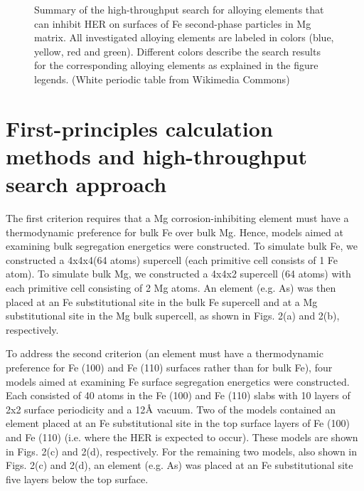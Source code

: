\begingroup
\begin{figure}[!ht]
  \centering
  \caption[Summary of the high-throughput search for alloying elements that can inhibit HER on surfaces of Fe second-phase particles in Mg matrix]{Summary of the high-throughput search for alloying elements that can inhibit \ac{HER} on surfaces of Fe second-phase particles in Mg matrix. All investigated alloying elements are labeled in colors (blue, yellow, red and green). Different colors describe the search results for the corresponding alloying elements as explained in the figure legends. (White periodic table from Wikimedia Commons)}
  \label{Chap:Mg_H:fig4}
\end{figure}
\endgroup

\section{First-principles calculation methods and high-throughput search approach}
\label{chap:Mg_H:sec:calculation}

The first criterion requires that a Mg corrosion-inhibiting element must have a thermodynamic preference for bulk Fe over bulk Mg. Hence, models aimed at examining bulk segregation energetics were constructed. To simulate bulk Fe, we constructed a 4x4x4(64 atoms) supercell (each primitive cell consists of 1 Fe atom). To simulate bulk Mg, we constructed a 4x4x2 supercell (64 atoms) with each primitive cell consisting of 2 Mg atoms. An element (e.g. As) was then placed at an Fe substitutional site in the bulk Fe supercell and at a Mg substitutional site in the Mg bulk supercell, as shown in Figs. 2(a) and 2(b), respectively.

To address the second criterion (an element must have a thermodynamic preference for Fe (100) and Fe (110) surfaces rather than for bulk Fe), four models aimed at examining Fe surface segregation energetics were constructed. Each consisted of 40 atoms in the Fe (100) and Fe (110) slabs with 10 layers of 2x2 surface periodicity and a 12$\mbox{\normalfont\AA}$ vacuum.  Two of the models contained an element placed at an Fe substitutional site in the top surface layers of Fe (100) and Fe (110) (i.e. where the \ac{HER} is expected to occur). These models are shown in Figs. 2(c) and 2(d), respectively. For the remaining two models, also shown in Figs. 2(c) and 2(d), an element (e.g. As) was placed at an Fe substitutional site five layers below the top surface.

